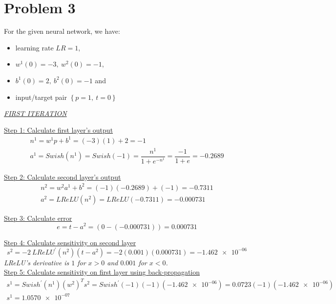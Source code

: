 \section{Problem 3}

For the given neural network, we have:
\begin{itemize}
	\item learning rate $LR = 1$,
	\item $w^1\left(0\right) = -3,\ w^2\left(0\right) = -1$,
	\item $b^1\left(0\right) = 2,\ b^2\left(0\right) = -1$ and
	\item input/target pair $\left\{p=1,\ t=0\right\}$
\end{itemize}
\vspace*{1mm}

\begin{center}
	\underline{\textit{FIRST ITERATION}}
\end{center}

\underline{Step 1: Calculate first layer's output}
\[
\begin{gathered}
n^1 = w^1 p + b^1 = (-3)(1) + 2 = -1\\
a^1 = {Swish}\left(n^1\right) = {Swish}\left(-1\right) = \dfrac{n^1}{1+e^{-n^1}} = \dfrac{-1}{1+e} = -0.2689
\end{gathered}
\]

\underline{Step 2: Calculate second layer's output}
\[
\begin{gathered}
n^2 = w^2 a^1 + b^2 = (-1)(-0.2689) + (-1) = -0.7311 \\ 
a^2 = {LReLU}\left(n^2\right) = {LReLU}\left(-0.7311\right) = -0.000731
\end{gathered}
\]

\underline{Step 3: Calculate error}
\[
e = t-a^2 = \left(0-\left(-0.000731\right)\right) = 0.000731
\]

\underline{Step 4: Calculate sensitivity on second layer}
\[
s^2 = -2\ {LReLU}^{'}\left(n^2\right)\left(t-a^2\right) = -2 \left(0.001\right) \left(0.000731\right) = \num{-1.462e-06}
\]
\textit{\small LReLU's derivative is $1$ for $x>0$ and $0.001$ for $x<0$.}\\ 

\underline{Step 5: Calculate sensitivity on first layer using back-propagation}
\[
\begin{gathered}
s^1 = Swish^{'} \left(n^1\right) \left(w^2\right)^T s^2 = Swish^{'} \left(-1\right) \left(-1\right) (\num{-1.462e-06}) = 0.0723 (-1) (\num{-1.462e-06}) \\
s^1 = \num{1.0570e-07}
\end{gathered}
\]

